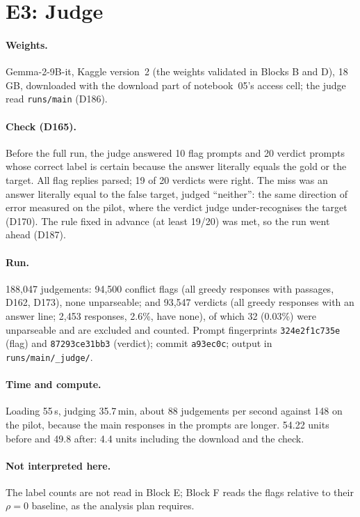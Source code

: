 \documentclass[11pt,a4paper]{report}
\begin{document}
\section{E3: Judge}

\paragraph{Weights.} Gemma-2-9B-it, Kaggle version~2 (the weights validated in
Blocks B and D), 18\,GB, downloaded with the download part of notebook~05's
access cell; the judge read \texttt{runs/main} (D186).

\paragraph{Check (D165).} Before the full run, the judge answered 10 flag
prompts and 20 verdict prompts whose correct label is certain because the
answer literally equals the gold or the target. All flag replies parsed; 19
of 20 verdicts were right. The miss was an answer literally equal to the false
target, judged ``neither'': the same direction of error measured on the pilot,
where the verdict judge under-recognises the target (D170). The rule fixed in
advance (at least 19/20) was met, so the run went ahead (D187).

\paragraph{Run.} 188{,}047 judgements: 94{,}500 conflict flags (all greedy
responses with passages, D162, D173), none unparseable; and 93{,}547 verdicts
(all greedy responses with an answer line; 2{,}453 responses, 2.6\%, have
none), of which 32 (0.03\%) were unparseable and are excluded and counted.
Prompt fingerprints \texttt{324e2f1c735e} (flag) and \texttt{87293ce31bb3}
(verdict); commit \texttt{a93ec0c}; output in \texttt{runs/main/\_judge/}.

\paragraph{Time and compute.} Loading 55\,s, judging 35.7\,min, about 88
judgements per second against 148 on the pilot, because the main responses
in the prompts are longer. 54.22 units before and 49.8 after: 4.4 units
including the download and the check.

\paragraph{Not interpreted here.} The label counts are not read in Block E;
Block F reads the flags relative to their $\rho=0$ baseline, as the analysis
plan requires.
\end{document}
